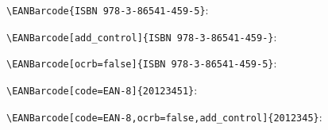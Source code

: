\documentclass{article}
\begin{document}
\raggedright
\verb|\EANBarcode{ISBN 978-3-86541-459-5}|:

\verb|\EANBarcode[add_control]{ISBN 978-3-86541-459-}|:

\verb|\EANBarcode[ocrb=false]{ISBN 978-3-86541-459-5}|:

\verb|\EANBarcode[code=EAN-8]{20123451}|:

\verb|\EANBarcode[code=EAN-8,ocrb=false,add_control]{2012345}|:
\end{document}
